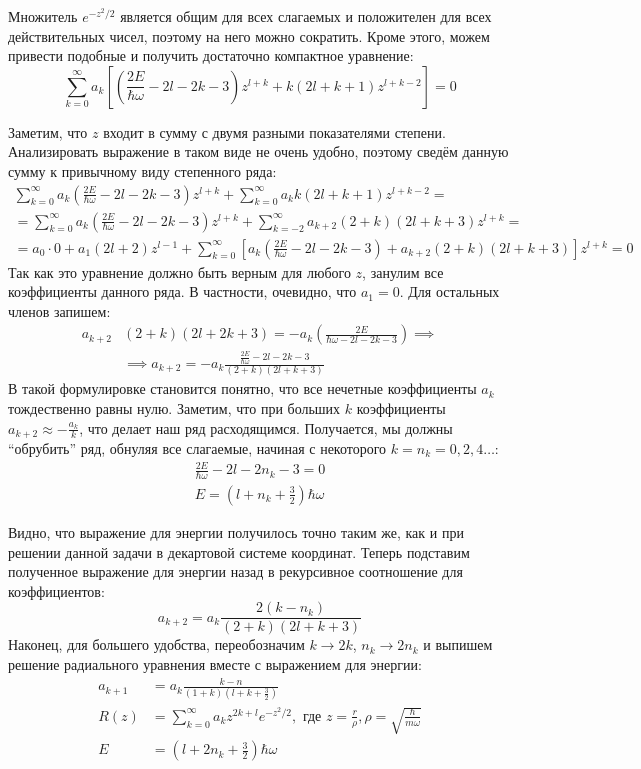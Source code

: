 Множитель $e^{-z^2/2}$ является общим для всех слагаемых и положителен для всех действительных чисел, поэтому на него можно сократить. Кроме этого, можем привести подобные и получить достаточно компактное уравнение:
\[
\sum_{k=0}^\infty a_k \left[\left(\frac{2E}{\hbar\omega} - 2l - 2k - 3\right)z^{l+k} + k(2l+k+1) z^{l+k-2}\right] = 0
\]

Заметим, что $z$ входит в сумму с двумя разными показателями степени. Анализировать выражение в таком виде не очень удобно, поэтому сведём данную сумму к привычному виду степенного ряда:
\begin{gather*}
    \sum_{k=0}^\infty a_k\left(\frac{2E}{\hbar\omega} - 2l - 2k -3\right)z^{l+k} + \sum_{k=0}^\infty a_k k(2l+k+1)z^{l+k-2} = \\
    = \sum_{k=0}^\infty a_k\left(\frac{2E}{\hbar\omega} - 2l - 2k -3\right)z^{l+k} + \sum_{k=-2}^\infty a_{k+2}(2+k)(2l+k+3)z^{l+k} = \\
    = a_0\cdot0 + a_1(2l+2)z^{l-1} + \sum_{k=0}^\infty \left[a_k\left(\frac{2E}{\hbar\omega} - 2l - 2k - 3\right) + a_{k+2}(2+k)(2l+k+3)\right]z^{l+k} = 0
\end{gather*}
Так как это уравнение должно быть верным для любого $z$, занулим все коэффициенты данного ряда. В частности, очевидно, что $a_1 = 0$. Для остальных членов запишем:
\begin{align*}
    a_{k+2}&(2+k)(2l+2k+3) = -a_k\left(\frac{2E}{\hbar\omega-2l-2k-3}\right) \implies \\
    &\implies a_{k+2} = -a_k\frac{\frac{2E}{\hbar\omega}-2l-2k-3}{(2+k)(2l+k+3)}
\end{align*}
В такой формулировке становится понятно, что все нечетные коэффициенты $a_k$ тождественно равны нулю. Заметим, что при больших $k$ коэффициенты $a_{k+2} \approx -\frac{a_k}{k}$, что делает наш ряд расходящимся. Получается, мы должны ``обрубить'' ряд, обнуляя все слагаемые, начиная с некоторого $k = n_k = 0, 2, 4 \dots$:
\begin{gather*}
    \frac{2E}{\hbar\omega}-2l-2n_k-3 = 0\\
    E = \left(l+n_k+\frac{3}{2}\right)\hbar\omega
\end{gather*}

Видно, что выражение для энергии получилось точно таким же, как и при решении данной задачи в декартовой системе координат. Теперь подставим полученное выражение для энергии назад в рекурсивное соотношение для коэффициентов:
\[
a_{k+2} = a_k\frac{2(k-n_k)}{(2+k)(2l+k+3)}
\]
Наконец, для большего удобства, переобозначим $k\rightarrow2k$, $n_k\rightarrow2n_k$ и выпишем решение радиального уравнения вместе с выражением для энергии:
\begin{align*}
    a_{k+1} &= a_k\frac{k-n}{\left(1+k\right)\left(l+k+\frac{3}{2}\right)} \\
    R(z) &= \sum_{k=0}^\infty a_k z^{2k+l} e^{-z^2/2}, \text{ где } z = \frac{r}{\rho}, \rho = \sqrt{\frac{\hbar}{m\omega}} \\
    E &= \left(l+2n_k+\frac{3}{2}\right)\hbar\omega
\end{align*}

